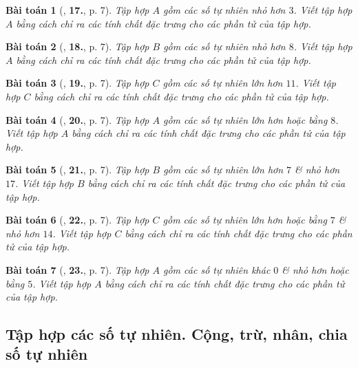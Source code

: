 \documentclass{article}
\numberwithin{equation}{section}
\newtheorem{baitoan}{Bài toán}[section]
\begin{document}
\begin{baitoan}[\cite{Trong_Toan_6_2021}, \textbf{17.}, p. 7]
	Tập hợp $A$ gồm các số tự nhiên nhỏ hơn $3$. Viết tập hợp $A$ bằng cách chỉ ra các tính chất đặc trưng cho các phần tử của tập hợp.
\end{baitoan}

\begin{baitoan}[\cite{Trong_Toan_6_2021}, \textbf{18.}, p. 7]
	Tập hợp $B$ gồm các số tự nhiên nhỏ hơn $8$. Viết tập hợp $A$ bằng cách chỉ ra các tính chất đặc trưng cho các phần tử của tập hợp.
\end{baitoan}

\begin{baitoan}[\cite{Trong_Toan_6_2021}, \textbf{19.}, p. 7]
	Tập hợp $C$ gồm các số tự nhiên lớn hơn $11$. Viết tập hợp $C$ bằng cách chỉ ra các tính chất đặc trưng cho các phần tử của tập hợp.
\end{baitoan}

\begin{baitoan}[\cite{Trong_Toan_6_2021}, \textbf{20.}, p. 7]
	Tập hợp $A$ gồm các số tự nhiên lớn hơn hoặc bằng $8$. Viết tập hợp $A$ bằng cách chỉ ra các tính chất đặc trưng cho các phần tử của tập hợp.
\end{baitoan}

\begin{baitoan}[\cite{Trong_Toan_6_2021}, \textbf{21.}, p. 7]
	Tập hợp $B$ gồm các số tự nhiên lớn hơn $7$ \& nhỏ hơn $17$. Viết tập hợp $B$ bằng cách chỉ ra các tính chất đặc trưng cho các phần tử của tập hợp.
\end{baitoan}

\begin{baitoan}[\cite{Trong_Toan_6_2021}, \textbf{22.}, p. 7]
	Tập hợp $C$ gồm các số tự nhiên lớn hơn hoặc bằng $7$ \& nhỏ hơn $14$. Viết tập hợp $C$ bằng cách chỉ ra các tính chất đặc trưng cho các phần tử của tập hợp.
\end{baitoan}

\begin{baitoan}[\cite{Trong_Toan_6_2021}, \textbf{23.}, p. 7]
	Tập hợp $A$ gồm các số tự nhiên khác $0$ \& nhỏ hơn hoặc bằng $5$. Viết tập hợp $A$ bằng cách chỉ ra các tính chất đặc trưng cho các phần tử của tập hợp.
\end{baitoan}

\subsection{Tập hợp các số tự nhiên. Cộng, trừ, nhân, chia số tự nhiên}
\end{document}
